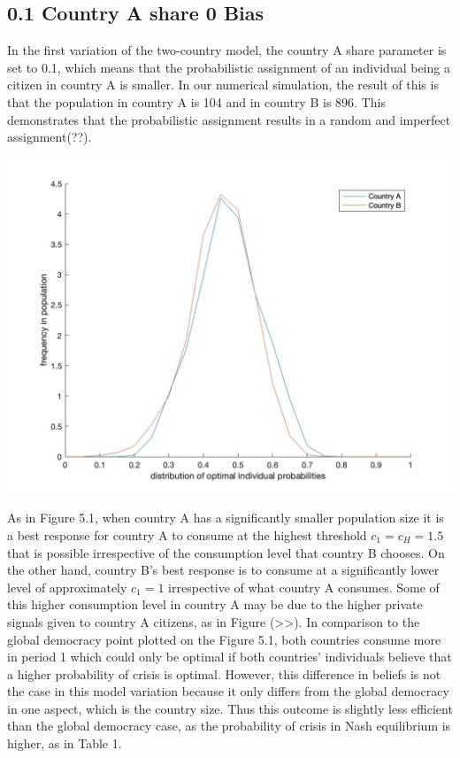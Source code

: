\documentclass[11pt,preprint, authoryear]{elsarticle}
\let\origfigure\figure
\let\endorigfigure\endfigure
\renewenvironment{figure}[1][2] {
    \expandafter\origfigure\expandafter[H]
} {
    \endorigfigure
}
\numberwithin{equation}{section}
\numberwithin{figure}{section}
\numberwithin{table}{section}
\begin{document}
\hypertarget{country-a-share-0-bias}{%
\subsection*{0.1 Country A share 0 Bias}\label{country-a-share-0-bias}}

In the first variation of the two-country model, the country A share
parameter is set to 0.1, which means that the probabilistic assignment
of an individual being a citizen in country A is smaller. In our
numerical simulation, the result of this is that the population in
country A is 104 and in country B is 896. This demonstrates that the
probabilistic assignment results in a random and imperfect
assignment(??).

\begin{figure}[H]

{\centering \includegraphics[width=0.45\linewidth]{images/Fig4_0.1Size0Bias} 

}

\caption{0.1 Country A share model: Kernel density function of the distribution of the optimal probabilty of crisis and frequency thereof across individuals in country A and country B}\label{fig:unnamed-chunk-5}
\end{figure}

As in Figure 5.1, when country A has a significantly smaller population
size it is a best response for country A to consume at the highest
threshold \(c_1=c_H=1.5\) that is possible irrespective of the
consumption level that country B chooses. On the other hand, country B's
best response is to consume at a significantly lower level of
approximately \(c_1=1\) irrespective of what country A consumes. Some of
this higher consumption level in country A may be due to the higher
private signals given to country A citizens, as in Figure
(\textgreater\textgreater). In comparison to the global democracy point
plotted on the Figure 5.1, both countries consume more in period 1 which
could only be optimal if both countries' individuals believe that a
higher probability of crisis is optimal. However, this difference in
beliefs is not the case in this model variation because it only differs
from the global democracy in one aspect, which is the country size. Thus
this outcome is slightly less efficient than the global democracy case,
as the probability of crisis in Nash equilibrium is higher, as in Table
1.
\end{document}
